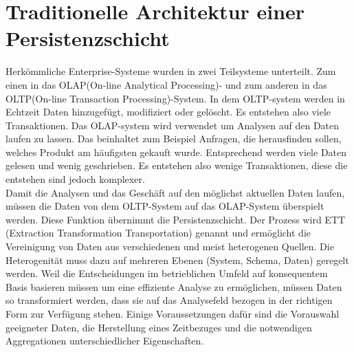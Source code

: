 \section{Traditionelle Architektur einer Persistenzschicht}
Herkömmliche Enterprise-Systeme wurden in zwei Teilsysteme unterteilt. Zum einen in das OLAP(On-line Analytical Processing)- und zum anderen in das OLTP(On-line Transaction Processing)-System. In dem OLTP-system werden in Echtzeit Daten hinzugefügt, modifiziert oder gelöscht. Es entstehen also viele Transaktionen. Das OLAP-system wird verwendet um Analysen auf den Daten laufen zu lassen. Das beinhaltet zum Beispiel Anfragen, die herausfinden sollen, welches Produkt am häufigsten gekauft wurde. Entsprechend werden viele Daten gelesen und wenig geschrieben. Es entstehen also wenige Transaktionen, diese die entstehen sind jedoch komplexer.
\\
Damit die Analysen und das Geschäft auf den möglichst aktuellen Daten laufen, müssen die Daten von dem OLTP-System auf das OLAP-System überspielt werden. Diese Funktion übernimmt die Persistenzschicht. Der Prozess wird ETT (Extraction Transformation Transportation) genannt und ermöglicht die Vereinigung von Daten aus verschiedenen und meist heterogenen Quellen. Die Heterogenität muss dazu auf mehreren Ebenen (System, Schema, Daten) geregelt werden. Weil die Entscheidungen im betrieblichen Umfeld auf konsequentem Basis basieren müssen um eine effiziente Analyse zu ermöglichen, müssen Daten so transformiert werden, dass sie auf das Analysefeld bezogen in der richtigen Form zur Verfügung stehen. Einige Voraussetzungen dafür sind die Vorauswahl geeigneter Daten, die Herstellung eines Zeitbezuges und die notwendigen Aggregationen unterschiedlicher Eigenschaften.\cite{koppen2014data}
